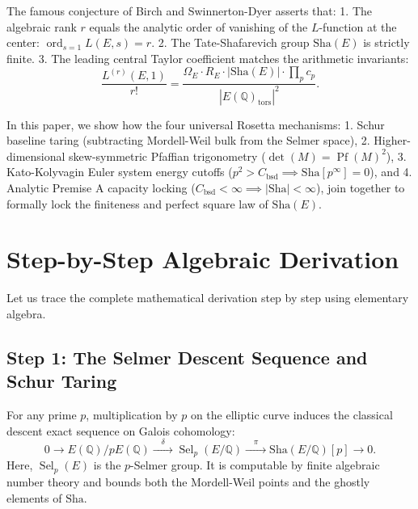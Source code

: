 \documentclass[11pt,a4paper]{article}
\providecommand{\Sha}{\mathrm{Sha}}
\theoremstyle{definition}
\begin{document}
The famous conjecture of Birch and Swinnerton-Dyer asserts that:
1. The algebraic rank $r$ equals the analytic order of vanishing of the $L$-function at the center: $\operatorname{ord}_{s=1} L(E, s) = r$.
2. The Tate-Shafarevich group $\Sha(E)$ is strictly finite.
3. The leading central Taylor coefficient matches the arithmetic invariants:
\begin{equation}
\frac{L^{(r)}(E, 1)}{r!} = \frac{\Omega_E \cdot R_E \cdot |\Sha(E)| \cdot \prod_p c_p}{|E(\mathbb{Q})_{\mathrm{tors}}|^2}.
\end{equation}

In this paper, we show how the four universal Rosetta mechanisms:
1. Schur baseline taring (subtracting Mordell-Weil bulk from the Selmer space),
2. Higher-dimensional skew-symmetric Pfaffian trigonometry ($\det(M) = \operatorname{Pf}(M)^2$),
3. Kato-Kolyvagin Euler system energy cutoffs ($p^2 > C_{\mathrm{bsd}} \implies \Sha[p^\infty] = 0$), and
4. Analytic Premise A capacity locking ($C_{\mathrm{bsd}} < \infty \implies |\Sha| < \infty$),
join together to formally lock the finiteness and perfect square law of $\Sha(E)$.


\section{Step-by-Step Algebraic Derivation}

Let us trace the complete mathematical derivation step by step using elementary algebra.

\subsection{Step 1: The Selmer Descent Sequence and Schur Taring}
For any prime $p$, multiplication by $p$ on the elliptic curve induces the classical descent exact sequence on Galois cohomology:
\begin{equation}
0 \longrightarrow E(\mathbb{Q})/p E(\mathbb{Q}) \xrightarrow{\quad\delta\quad} \operatorname{Sel}_p(E/\mathbb{Q}) \xrightarrow{\quad\pi\quad} \Sha(E/\mathbb{Q})[p] \longrightarrow 0.
\end{equation}
Here, $\operatorname{Sel}_p(E)$ is the $p$-Selmer group. It is computable by finite algebraic number theory and bounds both the Mordell-Weil points and the ghostly elements of $\Sha$.
\end{document}
